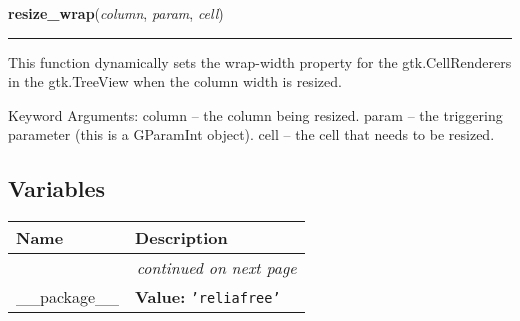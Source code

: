     \label{reliafree:widgets:resize_wrap}

    \vspace{0.5ex}

\hspace{.8\funcindent}\begin{boxedminipage}{\funcwidth}

    \raggedright \textbf{resize\_wrap}(\textit{column}, \textit{param}, \textit{cell})

    \vspace{-1.5ex}

    \rule{\textwidth}{0.5\fboxrule}
\setlength{\parskip}{2ex}
    This function dynamically sets the wrap-width property for the 
    gtk.CellRenderers in the gtk.TreeView when the column width is resized.

    Keyword Arguments: column -- the column being resized. param  -- the 
    triggering parameter (this is a GParamInt object). cell   -- the cell 
    that needs to be resized.

\setlength{\parskip}{1ex}
    \end{boxedminipage}



  \subsection{Variables}

    \vspace{-1cm}
\hspace{\varindent}\begin{longtable}{|p{\varnamewidth}|p{\vardescrwidth}|l}
\cline{1-2}
\cline{1-2} \centering \textbf{Name} & \centering \textbf{Description}& \\
\cline{1-2}
\endhead\cline{1-2}\multicolumn{3}{r}{\small\textit{continued on next page}}\\\endfoot\cline{1-2}
\endlastfoot\raggedright \_\-\_\-p\-a\-c\-k\-a\-g\-e\-\_\-\_\- & \raggedright \textbf{Value:} 
{\tt \texttt{'}\texttt{reliafree}\texttt{'}}&\\
\cline{1-2}
\end{longtable}

